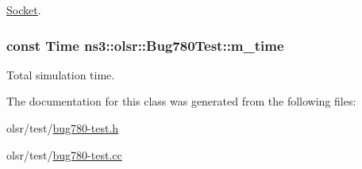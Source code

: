 \hyperlink{classns3_1_1Socket}{Socket}. 

\subsubsection[{\texorpdfstring{m\+\_\+time}{m_time}}]{\setlength{\rightskip}{0pt plus 5cm}const {\bf Time} ns3\+::olsr\+::\+Bug780\+Test\+::m\+\_\+time\hspace{0.3cm}{\ttfamily [private]}}\hypertarget{classns3_1_1olsr_1_1Bug780Test_a58303adf5a19764152e0718970fd38e6}{}\label{classns3_1_1olsr_1_1Bug780Test_a58303adf5a19764152e0718970fd38e6}


Total simulation time. 



The documentation for this class was generated from the following files\+:\begin{DoxyCompactItemize}
\item 
olsr/test/\hyperlink{bug780-test_8h}{bug780-\/test.\+h}\item 
olsr/test/\hyperlink{bug780-test_8cc}{bug780-\/test.\+cc}\end{DoxyCompactItemize}
